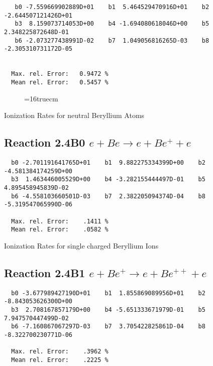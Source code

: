 \documentclass[12pt,dvipdfmx]{article}
\begin{document}
\begin{small}\begin{verbatim}
   b0 -7.559669902889D+01    b1  5.464529470916D+01    b2 -2.644507121426D+01
   b3  8.159073714053D+00    b4 -1.694080618046D+00    b5  2.348225872648D-01
   b6 -2.073277438991D-02    b7  1.049056816265D-03    b8 -2.305310731172D-05


  Max. rel. Error:   0.9472 %
  Mean rel. Error:   0.5457 %

\end{verbatim}\end{small}

\begin{figure} \label{2.2B}
\epsfxsize=16truecm
\end{figure}
\newpage

 Ionization Rates for neutral Beryllium Atoms

\subsection{
Reaction 2.4B0   $e + Be \rightarrow e + Be^+ + e $
}

\begin{small}\begin{verbatim}
  b0 -2.701191641765D+01    b1  9.882275334399D+00    b2 -4.581384174259D+00
  b3  1.463446005529D+00    b4 -3.282155444497D-01    b5  4.895458945839D-02
  b6 -4.558103660501D-03    b7  2.382205094374D-04    b8 -5.319547065990D-06

  Max. rel. Error:    .1411 %
  Mean rel. Error:    .0582 %

\end{verbatim}\end{small}

 Ionization Rates for
 single charged Beryllium Ions

\subsection{
Reaction 2.4B1  $e + Be^+ \rightarrow e + Be^{++} + e $
}


\begin{small}\begin{verbatim}
  b0 -3.677989427190D+01    b1  1.855869089956D+01    b2 -8.843053626300D+00
  b3  2.708167857179D+00    b4 -5.651333671979D-01    b5  7.947570447499D-02
  b6 -7.160867067297D-03    b7  3.705422825861D-04    b8 -8.322700230771D-06

  Max. rel. Error:    .3962 %
  Mean rel. Error:    .2225 %

\end{verbatim}\end{small}
\end{document}
